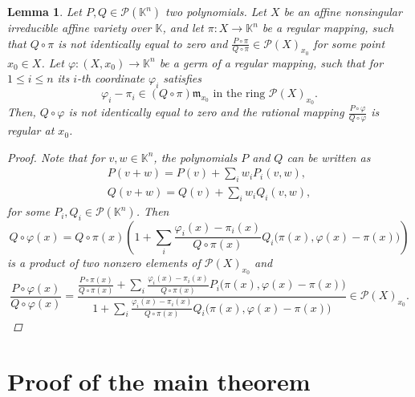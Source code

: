 \documentclass{amsart}
\theoremstyle{plain}
\newtheorem{lem}[thm]{Lemma}
\theoremstyle{definition}
\theoremstyle{remark}
\numberwithin{equation}{section}
\newcommand{\K}{\mathbb{K}}
\newcommand{\PP}{\mathcal{P}}
\begin{document}
\begin{lem}\label{denom_reduction}
Let $P,Q\in \PP(\K^n)$ two polynomials. Let $X$ be an affine nonsingular irreducible affine variety over $\K$, and let $\pi:X\rightarrow \K^n$ be a regular mapping, such that $Q\circ \pi$ is not identically equal to zero and $\frac{P\circ \pi}{Q\circ \pi}\in \PP(X)_{x_0}$ for some point $x_0\in X$. Let $\varphi:(X,x_0)\rightarrow \K^n$ be a germ of a regular mapping, such that for $1\leq i \leq n$ its $i$-th coordinate $\varphi_i$ satisfies
\begin{equation*}
    \varphi_i-\pi_i\in (Q\circ\pi)\mathfrak{m}_{x_0}\text{ in the ring }\PP(X)_{x_0}.
\end{equation*}
Then, $Q\circ\varphi$ is not identically equal to zero and the rational mapping $\frac{P\circ \varphi}{Q\circ \varphi}$ is regular at $x_0$.
\begin{proof}
Note that for $v,w\in\K^n$, the polynomials $P$ and $Q$ can be written as
\begin{align*}
    P(v+w)=P(v)+\sum_i w_i P_i(v,w),\\
    Q(v+w)=Q(v)+\sum_i w_i Q_i(v,w),
\end{align*}
for some $P_i,Q_i\in \PP(\K^n)$. Then
\begin{equation*}
    Q\circ\varphi(x)=Q\circ\pi(x)\left(1+\sum_i \frac{\varphi_i(x)-\pi_i(x)}{Q\circ\pi(x)} Q_i\big(\pi(x),\varphi(x)-\pi(x)\big)\right)
\end{equation*}
is a product of two nonzero elements of $\PP(X)_{x_0}$ and
\begin{equation*}
    \frac{P\circ\varphi(x)}{Q\circ\varphi(x)}=\frac{\frac{P\circ\pi(x)}{Q\circ\pi(x)}+\sum_i \frac{\varphi_i(x)-\pi_i(x)}{Q\circ \pi(x)} P_i\big(\pi(x),\varphi(x)-\pi(x)\big)}{1+\sum_i \frac{\varphi_i(x)-\pi_i(x)}{Q\circ\pi(x)} Q_i\big(\pi(x),\varphi(x)-\pi(x)\big)}\in\PP(X)_{x_0}.
\end{equation*}
\end{proof}
\end{lem}

\section{Proof of the main theorem}
\end{document}
